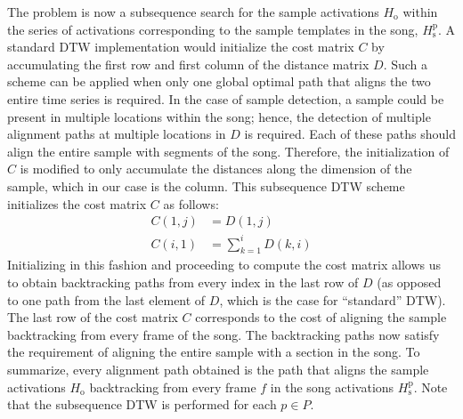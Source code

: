 \documentclass{article}
\begin{document}
The problem is now a subsequence search for the sample activations $H_\mathrm{o}$ within the series of activations corresponding to the sample templates in the song, $H_{\mathrm{s}}^{\mathrm{p}}$. %
A standard DTW implementation would initialize the cost matrix $C$ by accumulating the first row and first column of the distance matrix $D$.
Such a scheme can be applied when only one global optimal path that aligns the two entire time series is required. In the case of sample detection, a sample could be present in multiple locations within the song; hence, the detection of multiple alignment paths at multiple locations in $D$ is required. Each of these paths should align the entire sample with segments of the song. Therefore, the initialization of $C$ is modified to only accumulate the distances along the dimension of the sample, which in our case is the column. This subsequence DTW scheme\cite{Müller2007} initializes the cost matrix $C$ as follows:
\begin{equation}
\label{cost_init_new}
\begin{aligned}
C(1,j) &= D(1,j)\\
C(i,1) &= \sum_{k=1}^{i} D(k,i)
\end{aligned}
\end{equation}
Initializing in this fashion and proceeding to compute the cost matrix allows us to obtain backtracking paths from every index in the last row of $D$ (as opposed to one path from the last element of $D$, which is the case for ``standard'' DTW). The last row of the cost matrix $C$ corresponds to the cost of aligning the sample backtracking from every frame of the song. The backtracking paths now satisfy the requirement of aligning the entire sample with a section in the song. To summarize, every alignment path obtained is the path that aligns the sample activations $H_\mathrm{o}$ backtracking from every frame $f$ in the song activations $H_{\mathrm{s}}^{\mathrm{p}}$. Note that the subsequence DTW is performed for each $p \in P$.
\end{document}
